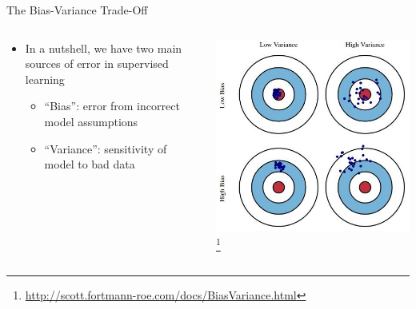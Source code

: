 \documentclass[aspectratio=169]{beamer}
\begin{document}
\begin{frame}{The Bias-Variance Trade-Off}

\begin{columns}
\begin{column}{0.5\textwidth}
\begin{itemize}
\item In a nutshell, we have two main sources of error in supervised learning
	\begin{itemize}
	\item ``Bias'': error from incorrect model assumptions
	\item ``Variance'': sensitivity of model to bad data
	\end{itemize}
\end{itemize}
\end{column}
\begin{column}{0.5\textwidth}
\includegraphics[width=1\textwidth]{./lectReg/bias-and-variance.jpg}
\footnote{\url{http://scott.fortmann-roe.com/docs/BiasVariance.html}}
\end{column}
\end{columns}


\end{frame}
\end{document}
